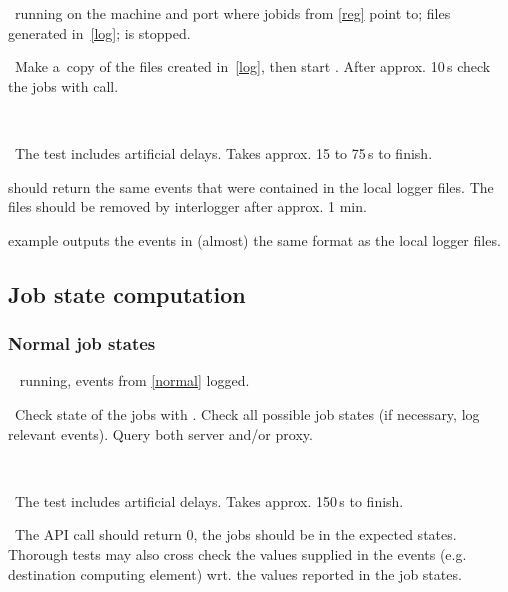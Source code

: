 \req\ running  on the machine and port where
jobids from \ref{reg} point to; files generated in~\ref{log};
 is stopped.

\what\ Make a~copy of the files created in~\ref{log}, then start
. After approx. 10\,s check the jobs
with  call.

\how\ 

\note\ The test includes artificial delays. Takes approx. 15 to 75\,s to finish.

\result {} should return the same events that were
contained in the local logger files. The files should be removed by
interlogger after approx. 1 min.

\begin{hints}
 example outputs the events in (almost) the same
format as the local logger files.
\end{hints}




\subsection{Job state computation}

\subsubsection{Normal job states}
\label{state}

\req\  running, events from \ref{normal} logged.

\what\ Check state of the jobs with . Check all possible job states 
(if necessary, log relevant events). Query both server and/or proxy.

\how\ 

\note\ The test includes artificial delays. Takes approx. 150\,s to finish.

\result\ The API call should return 0, the jobs should be in the expected
states. Thorough tests may also cross check the values supplied in the
events (e.g. destination computing element) wrt. the values reported in the job states.







